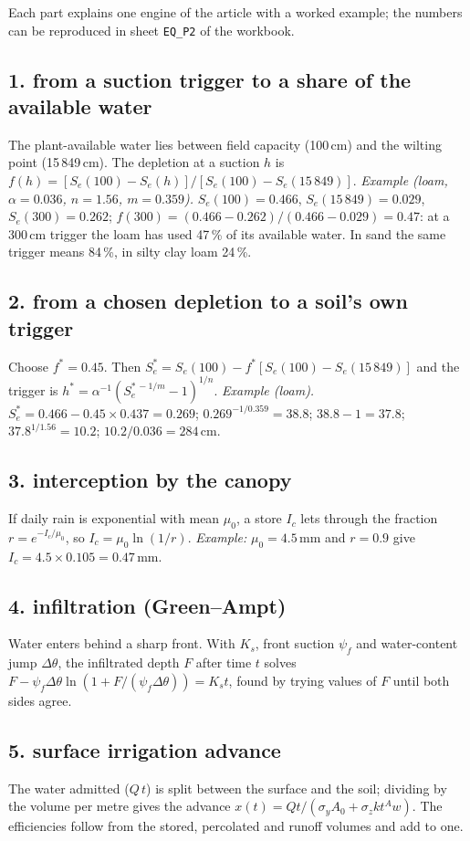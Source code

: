 Each part explains one engine of the article with a worked example; the numbers can be reproduced in sheet \texttt{EQ\_P2} of the workbook.

\subsection{1. from a suction trigger to a share of the available water}
The plant-available water lies between field capacity (100\,cm) and the wilting point (15\,849\,cm). The depletion at a suction $h$ is $f(h)=[S_e(100)-S_e(h)]/[S_e(100)-S_e(15\,849)]$.
\emph{Example (loam, $\alpha=0.036$, $n=1.56$, $m=0.359$).} $S_e(100)=0.466$, $S_e(15\,849)=0.029$, $S_e(300)=0.262$; $f(300)=(0.466-0.262)/(0.466-0.029)=0.47$: at a 300\,cm trigger the loam has used 47\,\% of its available water. In sand the same trigger means 84\,\%, in silty clay loam 24\,\%.

\subsection{2. from a chosen depletion to a soil's own trigger}
Choose $f^\ast=0.45$. Then $S_e^\ast=S_e(100)-f^\ast[S_e(100)-S_e(15\,849)]$ and the trigger is $h^\ast=\alpha^{-1}(S_e^{\ast\,-1/m}-1)^{1/n}$.
\emph{Example (loam).} $S_e^\ast=0.466-0.45\times0.437=0.269$; $0.269^{-1/0.359}=38.8$; $38.8-1=37.8$; $37.8^{1/1.56}=10.2$; $10.2/0.036=284$\,cm.

\subsection{3. interception by the canopy}
If daily rain is exponential with mean $\mu_0$, a store $I_c$ lets through the fraction $r=e^{-I_c/\mu_0}$, so $I_c=\mu_0\ln(1/r)$. \emph{Example:} $\mu_0=4.5$\,mm and $r=0.9$ give $I_c=4.5\times0.105=0.47$\,mm.

\subsection{4. infiltration (Green--Ampt)}
Water enters behind a sharp front. With $K_s$, front suction $\psi_f$ and water-content jump $\Delta\theta$, the infiltrated depth $F$ after time $t$ solves $F-\psi_f\Delta\theta\ln(1+F/(\psi_f\Delta\theta))=K_st$, found by trying values of $F$ until both sides agree.

\subsection{5. surface irrigation advance}
The water admitted ($Q\,t$) is split between the surface and the soil; dividing by the volume per metre gives the advance $x(t)=Qt/(\sigma_yA_0+\sigma_zkt^Aw)$. The efficiencies follow from the stored, percolated and runoff volumes and add to one.

